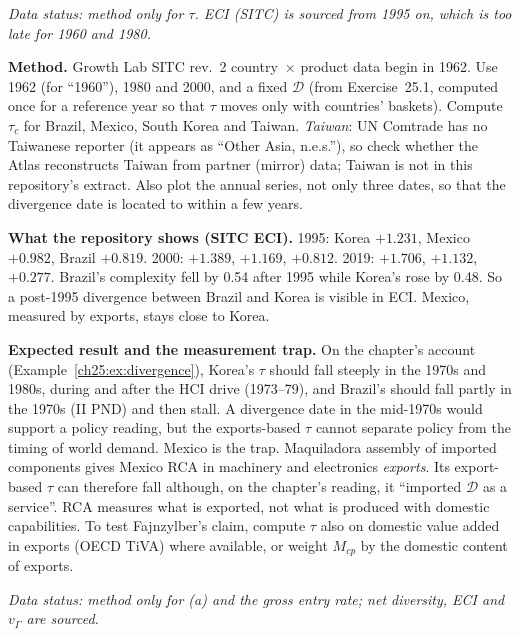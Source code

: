 \documentclass[../solutions_manual.tex]{subfiles}
\begin{document}

\emph{Data status: method only for $\tau$. ECI (SITC) is sourced from 1995 on, which is too late for 1960 and 1980.}

 \textbf{Method.} Growth Lab SITC rev.~2 country~$\times$ product data begin in 1962. Use 1962 (for ``1960''), 1980 and 2000, and a fixed $\mathcal{D}$ (from Exercise~25.1, computed once for a reference year so that $\tau$ moves only with countries' baskets). Compute $\tau_c$ for Brazil, Mexico, South Korea and Taiwan. \emph{Taiwan}: UN Comtrade has no Taiwanese reporter (it appears as ``Other Asia, n.e.s.''), so check whether the Atlas reconstructs Taiwan from partner (mirror) data; Taiwan is not in this repository's extract. Also plot the annual series, not only three dates, so that the divergence date is located to within a few years.

 \textbf{What the repository shows (SITC ECI).} 1995: Korea $+1.231$, Mexico $+0.982$, Brazil $+0.819$. 2000: $+1.389$, $+1.169$, $+0.812$. 2019: $+1.706$, $+1.132$, $+0.277$. Brazil's complexity fell by 0.54 after 1995 while Korea's rose by 0.48. So a post-1995 divergence between Brazil and Korea is visible in ECI. Mexico, measured by exports, stays close to Korea.

 \textbf{Expected result and the measurement trap.} On the chapter's account (Example~\ref{ch25:ex:divergence}), Korea's $\tau$ should fall steeply in the 1970s and 1980s, during and after the HCI drive (1973--79), and Brazil's should fall partly in the 1970s (II PND) and then stall. A divergence date in the mid-1970s would support a policy reading, but the exports-based $\tau$ cannot separate policy from the timing of world demand. Mexico is the trap. Maquiladora assembly of imported components gives Mexico RCA in machinery and electronics \emph{exports}. Its export-based $\tau$ can therefore fall although, on the chapter's reading, it ``imported $\mathcal{D}$ as a service''. RCA measures what is exported, not what is produced with domestic capabilities. To test Fajnzylber's claim, compute $\tau$ also on domestic value added in exports (OECD TiVA) where available, or weight $M_{cp}$ by the domestic content of exports.


\emph{Data status: method only for (a) and the gross entry rate; net diversity, ECI and $v_\Gamma$ are sourced.}
\end{document}
